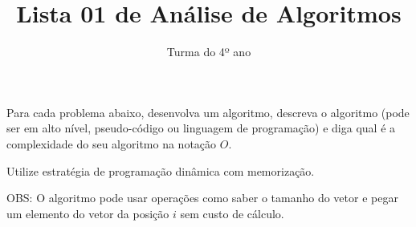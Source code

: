 \documentclass[12pt]{article}
\title{Lista 01 de Análise de Algoritmos}
\date{}
\author{Turma do 4º ano}
\begin{document}
 

\maketitle

\vspace{3em}


Para cada problema abaixo, desenvolva um algoritmo, 
descreva o algoritmo (pode ser em alto nível, pseudo-código ou 
linguagem de programação) e 
diga qual é a complexidade do seu algoritmo na notação $O$.

Utilize estratégia de programação dinâmica com memorização.

OBS: O algoritmo pode usar operações como saber o tamanho do 
vetor e pegar um elemento do vetor da posição $i$ sem custo de 
cálculo.
\end{document}
